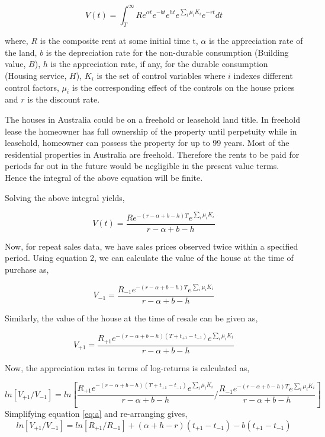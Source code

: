 \documentclass[AEJ,reqno, draftmode]{AEA} %
\begin{document}
\begin{equation}
    V(t) = \int_{T}^{\infty} R e^{\alpha t} e^{-bt} e^{ht} e^{\sum_{i} \mu_i K_i} e^{-rt} dt
\end{equation}

where, $R$ is the composite rent at some initial time t, $\alpha$ is the appreciation rate of the land, $b$ is the depreciation rate for the non-durable consumption (Building value, $B$), $h$ is the appreciation rate, if any, for the durable consumption (Housing service, $H$), $K_i$ is the set of control variables where $i$ indexes different control factors, $\mu_i$ is the corresponding effect of the controls on the house prices and $r$ is the discount rate. 

The houses in Australia could be on a freehold or leasehold land title. In freehold lease the homeowner has full ownership of the property until perpetuity while in leasehold, homeowner can possess the property for up to 99 years. Most of the residential properties in Australia are freehold. Therefore the rents to be paid for periods far out in the future would be negligible in the present value terms. Hence the integral of the above equation will be finite. 

Solving the above integral yields,

\begin{equation}
    V(t) = \frac{R e^{-(r-\alpha+b-h)T} e^{\sum_{i} \mu_i K_i}}{r-\alpha+b-h}
\end{equation}

Now, for repeat sales data, we have sales prices observed twice within a specified period. Using equation 2, we can calculate the value of the house at the time of purchase as,

\begin{equation}
    V_{-1} = \frac{R_{-1} e^{-(r-\alpha+b-h)T} e^{\sum_{i} \mu_i K_i}}{r-\alpha+b-h}
\end{equation}

Similarly, the value of the house at the time of resale can be given as,

\begin{equation}
    V_{+1} = \frac{R_{+1} e^{-(r-\alpha+b-h)(T+t_{+1}-t_{-1})} e^{\sum_{i} \mu_i K_i}}{r-\alpha+b-h}
\end{equation}

Now, the appreciation rates in terms of log-returns is calculated as,

\begin{equation} \label{eq:a}
    ln [V_{+1}/V_{-1}] = ln [\frac{R_{+1} e^{-(r-\alpha+b-h)(T+t_{+1}-t_{-1})} e^{\sum_{i} \mu_i K_i}}{r-\alpha+b-h} / \frac{R_{-1} e^{-(r-\alpha+b-h)T} e^{\sum_{i} \mu_i K_i}}{r-\alpha+b-h}]
\end{equation}
Simplifying equation \ref{eq:a} and re-arranging gives,
\begin{equation}
    ln [V_{+1}/V_{-1}] = ln [R_{+1}/R_{-1}] + (\alpha+h-r)(t_{+1}-t_{-1}) - b(t_{+1}-t_{-1}) 
\end{equation}
\end{document}
